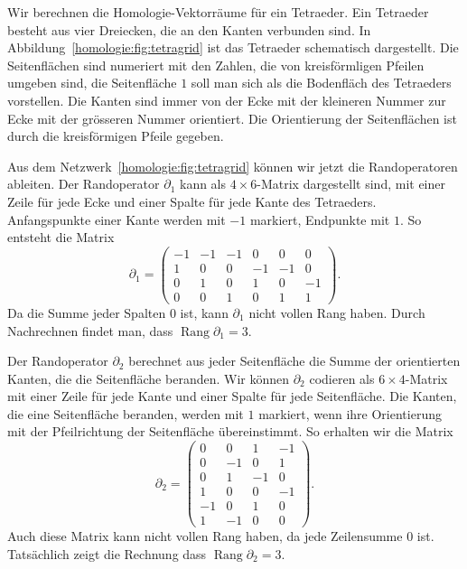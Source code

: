 Wir berechnen die Homologie-Vektorräume für ein Tetraeder.
Ein Tetraeder besteht aus vier Dreiecken, die an den Kanten
verbunden sind.
In Abbildung~\ref{homologie:fig:tetragrid} ist das Tetraeder
schematisch dargestellt.
Die Seitenflächen sind numeriert mit den Zahlen, die von kreisförmligen
Pfeilen umgeben sind, die Seitenfläche $1$ soll man sich als die Bodenfläch
des Tetraeders vorstellen.
Die Kanten sind immer von der Ecke mit der kleineren Nummer zur
Ecke mit der grösseren Nummer orientiert.
Die Orientierung der Seitenflächen ist durch die kreisförmigen Pfeile
gegeben.

Aus dem Netzwerk~\ref{homologie:fig:tetragrid} können wir jetzt die
Randoperatoren ableiten.
Der Randoperator $\partial_1$ kann als $4\times 6$-Matrix dargestellt sind,
mit einer Zeile für jede Ecke und einer Spalte für jede Kante des
Tetraeders.
Anfangspunkte einer Kante werden mit $-1$ markiert, Endpunkte mit $1$.
So entsteht die Matrix
\[
\partial_1
=
\begin{pmatrix}
-1&-1&-1& 0& 0& 0\\
 1& 0& 0&-1&-1& 0\\
 0& 1& 0& 1& 0&-1\\
 0& 0& 1& 0& 1& 1
\end{pmatrix}.
\] 
Da die Summe jeder Spalten $0$ ist, kann $\partial_1$ nicht vollen Rang
haben.
Durch Nachrechnen findet man, dass $\operatorname{Rang}\partial_1=3$.

Der Randoperator $\partial_2$ berechnet aus jeder Seitenfläche die Summe
der orientierten Kanten, die die Seitenfläche beranden.
Wir können $\partial_2$ codieren als $6\times 4$-Matrix mit einer Zeile
für jede Kante und einer Spalte für jede Seitenfläche.
Die Kanten, die eine Seitenfläche beranden, werden mit $1$ markiert,
wenn ihre Orientierung mit der Pfeilrichtung der Seitenfläche übereinstimmt.
So erhalten wir die Matrix
\[
\partial_2
=
\begin{pmatrix}
 0& 0& 1&-1\\
 0&-1& 0& 1\\
 0& 1&-1& 0\\
 1& 0& 0&-1\\
-1& 0& 1& 0\\
 1&-1& 0& 0
\end{pmatrix}.
\]
Auch diese Matrix kann nicht vollen Rang haben, da jede Zeilensumme $0$ ist.
Tatsächlich zeigt die Rechnung dass $\operatorname{Rang}\partial_2 = 3$.

